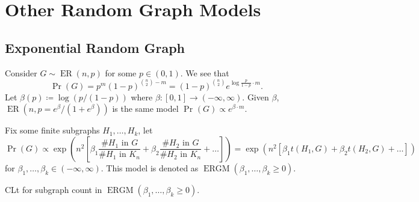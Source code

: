 \chapter{Other Random Graph Models}
\section{Exponential Random Graph}
Consider \(G \sim \operatorname{ER}(n, p) \) for some \(p \in (0, 1)\). We see that
\[
	\Pr_{}\left(G\right)
	= p^{m} (1 - p)^{\binom{n}{2} - m}
	= (1 - p)^{\binom{n}{2}} e^{\log \frac{p}{1-p} \cdot m}.
\]
Let \(\beta (p) \coloneqq \log (p / (1 - p))\) where \(\beta \colon [0, 1] \to (-\infty , \infty )\). Given \(\beta \), \(\operatorname{ER}(n, p = e^\beta / (1 + e^{\beta })) \) is the same model \(\Pr_{}\left(G\right) \propto e^{\beta \cdot m}\).

Fix some finite subgraphs \(H_1, \dots , H_k\), let
\[
	\Pr_{}\left(G\right)
	\propto \exp (n^2 \left[ \beta _1 \frac{\text{\#\(H_1\) in \(G\)}}{\text{\#\(H_1\) in \(K_n\)}} + \beta _2 \frac{\text{\#\(H_2\) in \(G\)}}{\text{\#\(H_2\) in \(K_n\)}} + \dots  \right] )
	= \exp (n^2 \left[ \beta _1 t(H_1, G) + \beta _2 t(H_2, G) + \dots  \right] )
\]
for \(\beta _1, \dots , \beta _k \in (-\infty , \infty )\). This model is denoted as \(\operatorname{ERGM}(\beta _1, \dots , \beta _k \geq 0) \).

\begin{problem*}
	CLt for subgraph count in \(\operatorname{ERGM}(\beta _1, \dots , \beta _k \geq 0) \).
\end{problem*}